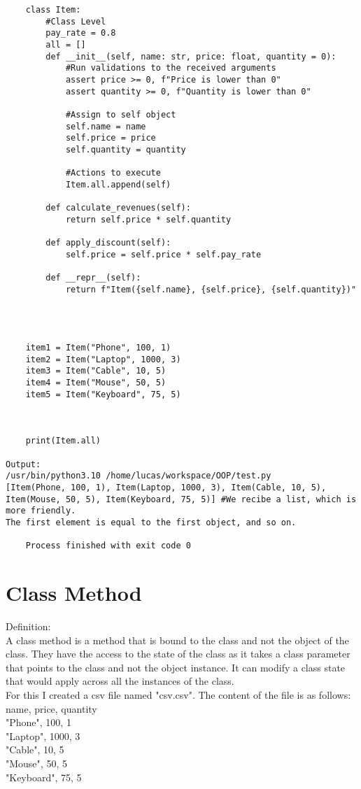 \documentclass{article}
\begin{document}
\begin{lstlisting}
	class Item:
		#Class Level
		pay_rate = 0.8
		all = []
		def __init__(self, name: str, price: float, quantity = 0):
			#Run validations to the received arguments
			assert price >= 0, f"Price is lower than 0"
			assert quantity >= 0, f"Quantity is lower than 0"
			
			#Assign to self object
			self.name = name
			self.price = price
			self.quantity = quantity
			
			#Actions to execute
			Item.all.append(self)
			
		def calculate_revenues(self):
			return self.price * self.quantity
		
		def apply_discount(self):
			self.price = self.price * self.pay_rate
		
		def __repr__(self):
			return f"Item({self.name}, {self.price}, {self.quantity})"
		
		
		
	
	item1 = Item("Phone", 100, 1)
	item2 = Item("Laptop", 1000, 3)
	item3 = Item("Cable", 10, 5)
	item4 = Item("Mouse", 50, 5)
	item5 = Item("Keyboard", 75, 5)
	
	
	
	print(Item.all)
	
Output:
/usr/bin/python3.10 /home/lucas/workspace/OOP/test.py 
[Item(Phone, 100, 1), Item(Laptop, 1000, 3), Item(Cable, 10, 5), Item(Mouse, 50, 5), Item(Keyboard, 75, 5)] #We recibe a list, which is more friendly.
The first element is equal to the first object, and so on.
	
	Process finished with exit code 0
\end{lstlisting}

\section{Class Method}
Definition:\\
A class method is a method that is bound to the class and not the object of the class. They have the access to the state of the class as it takes a class parameter that points to the class and not the object instance. It can modify a class state that would apply across all the instances of the class.\\


For this I created a csv file named "csv.csv". The content of the file is as follows:\\


\noindent name, price, quantity\\
\noindent"Phone", 100, 1\\
\noindent"Laptop", 1000, 3\\
\noindent"Cable", 10, 5\\
\noindent"Mouse", 50, 5\\
\noindent"Keyboard", 75, 5\\
\end{document}
